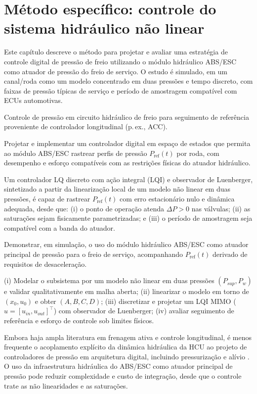 \chapter{Método específico: controle do sistema hidráulico não linear}
\label{cap:controle}

Este capítulo descreve o método para projetar e avaliar uma estratégia de controle digital de pressão de freio utilizando o módulo hidráulico ABS/ESC como atuador de pressão do freio de serviço. O estudo é simulado, em um canal/roda como um modelo concentrado em duas pressões e tempo discreto, com faixas de pressão típicas de serviço e período de amostragem compatível com ECUs automotivas.

Controle de pressão em circuito hidráulico de freio para seguimento de referência proveniente de controlador longitudinal (p.\,ex., ACC).

Projetar e implementar um controlador digital em espaço de estados que permita ao módulo ABS/ESC rastrear perfis de pressão $P_{\mathrm{ref}}(t)$ por roda, com desempenho e esforço compatíveis com as restrições físicas do atuador hidráulico.

Um controlador LQ discreto com ação integral (LQI) e observador de Luenberger, sintetizado a partir da linearização local de um modelo não linear em duas pressões, é capaz de rastrear $P_{\mathrm{ref}}(t)$ com erro estacionário nulo e dinâmica adequada, desde que: (i) o ponto de operação atenda $\Delta P>0$ nas válvulas; (ii) as saturações sejam fisicamente parametrizadas; e (iii) o período de amostragem seja compatível com a banda do atuador.

Demonstrar, em simulação, o uso do módulo hidráulico ABS/ESC como atuador principal de pressão para o freio de serviço, acompanhando $P_{\mathrm{ref}}(t)$ derivado de requisitos de desaceleração.

(i) Modelar o subsistema por um modelo não linear em duas pressões $(P_{sup},P_w)$ e validar qualitativamente em malha aberta; (ii) linearizar o modelo em torno de $(x_0,u_0)$ e obter $(A,B,C,D)$; (iii) discretizar e projetar um LQI MIMO \big($u=[u_{in},u_{out}]^\top$\big) com observador de Luenberger; (iv) avaliar seguimento de referência e esforço de controle sob limites físicos.

Embora haja ampla literatura em frenagem ativa e controle longitudinal, é menos frequente o acoplamento explícito da dinâmica hidráulica da HCU ao projeto de controladores de pressão em arquitetura digital, incluindo pressurização e alívio \cite{HouhuaJing2022,PressureCoordinatedControl2023}. O uso da infraestrutura hidráulica do ABS/ESC como atuador principal de pressão pode reduzir complexidade e custo de integração, desde que o controle trate as não linearidades e as saturações.

